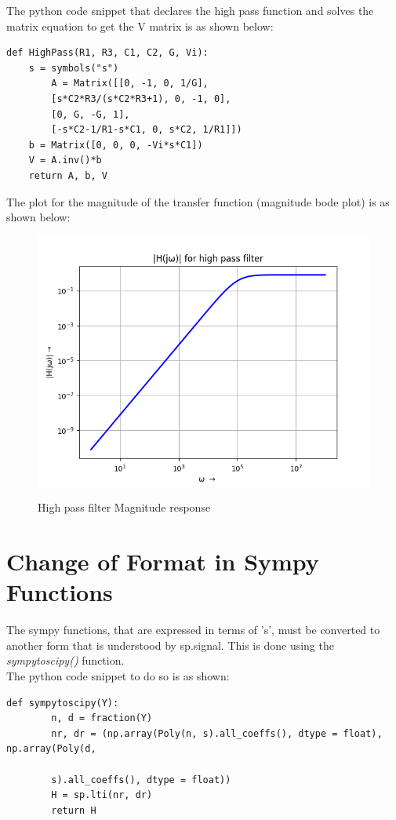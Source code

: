 \documentclass[11pt, a4paper]{article}
\begin{document}
The python code snippet that declares the high pass function and solves the matrix equation to get the V matrix is as shown below:

\begin{verbatim}
def HighPass(R1, R3, C1, C2, G, Vi):
    s = symbols("s")
	    A = Matrix([[0, -1, 0, 1/G],
        [s*C2*R3/(s*C2*R3+1), 0, -1, 0],
        [0, G, -G, 1],
        [-s*C2-1/R1-s*C1, 0, s*C2, 1/R1]])
    b = Matrix([0, 0, 0, -Vi*s*C1])
    V = A.inv()*b
    return A, b, V  
\end{verbatim}
The plot for the magnitude of the transfer function (magnitude bode plot) is as shown below:
\begin{figure}[!tbh]
   	\centering
   	\includegraphics[width=1.0\textwidth]{Ass7_Figure_3.png}
   	\label{fig:32}
   	\caption{High pass filter Magnitude response}
   \end{figure}
\section*{Change of Format in Sympy Functions}
The sympy functions, that are expressed in terms of 's', must be converted to another form that is understood by sp.signal. This is done using the \textit{sympytoscipy()} function.\\
The python code snippet to do so is as shown:
 \begin{verbatim}
def sympytoscipy(Y):
    	n, d = fraction(Y)
    	nr, dr = (np.array(Poly(n, s).all_coeffs(), dtype = float), np.array(Poly(d,
    	
    	s).all_coeffs(), dtype = float))
    	H = sp.lti(nr, dr)
    	return H
\end{verbatim}	
\end{document}
